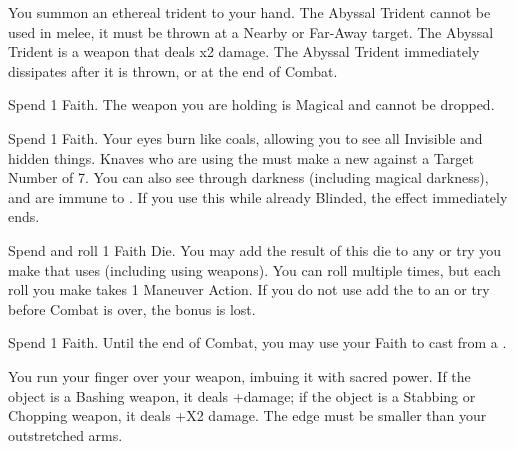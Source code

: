 \begin{multicols*}{2}
\LITURGY [
  Name = Abyssal Trident,
  Link = arcana-mystery-abyssal-trident,
  Paradigm = Cthonic,
  Duration=1 Maneuver Action
]

You summon an ethereal trident to your hand. The Abyssal Trident cannot be used in melee, it must be thrown at a Nearby or Far-Away target. The Abyssal Trident is a \FOC weapon that deals \DICE x2 damage. The Abyssal Trident immediately dissipates after it is thrown, or at the end of Combat. 

\LITURGY [
    Name=Blessed Blade,
    Link= arcana-mystery-blessed-blade,
    Paradigm = Righteous,
    Duration=1 Maneuver Action
]

Spend 1 Faith. The weapon you are holding is Magical and cannot be dropped.

\LITURGY [
  Name = Eye of Flame,
  Link = arcana-mystery-eye-of-flame,
  Paradigm = Righteous,
  Duration=1 Maneuver Action
]

Spend 1 Faith. Your eyes burn like coals, allowing you to see all Invisible and hidden things. Knaves who are using the  must make a new  against a Target Number of 7. You can also see through darkness (including magical darkness), and are immune to . If you use this while already Blinded, the effect immediately ends.




\LITURGY [
  Name = Great Strength,
  Link = arcana-mystery-great-strength,
  Paradigm = Errant,
  Duration=1 Maneuver Action
]

Spend  and roll 1 Faith Die. You may add the result of this die to any \RO or \RB try you make that uses \VIG (including using \VIG weapons). You can roll multiple times, but each roll you make takes 1 Maneuver Action. If you do not use add the \SUMDICE to an \RO or \RB try before Combat is over, the bonus is lost.

\LITURGY [
  Name = Hecate's Blessing,
  Link = arcana-mystery-hecates-blessing,
  Paradigm = Cunning,
  Duration=1 Maneuver Action
]

Spend 1 Faith. Until the end of Combat, you may use your Faith to cast  from a .

\LITURGY [
  Name = Hone,
  Link = arcana-mystery-hone,
  Paradigm = Civilized,
  Duration=1 Maneuver Action
]

You run your finger over your weapon, imbuing it with sacred power. If the object is a Bashing weapon, it deals +\DICE damage; if the object is a Stabbing or Chopping weapon, it deals +\DICE X2 damage. The edge must be smaller than your outstretched arms.



\end{multicols*}

